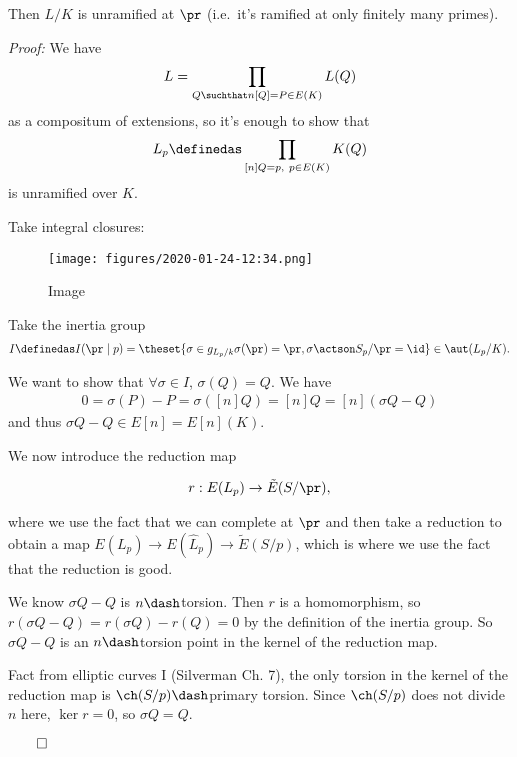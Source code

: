 Then \(L/K\) is unramified at \(\pr\) (i.e.~it's ramified at only
finitely many primes).

\emph{Proof:} We have
\begin{align*}
L = \prod_{Q \suchthat n[Q] = P \in E(K)} L(Q)
\end{align*} as a compositum of extensions, so it's enough to show that
\begin{align*}
L_p \definedas \prod_{[n] Q = p, ~p \in E(K)} K(Q)
\end{align*} is unramified over \(K\).

Take integral closures:

\begin{figure}
\centering
\texttt{[image: figures/2020-01-24-12:34.png]}
\caption{Image}
\end{figure}

Take the inertia group
\begin{align*}
I \definedas I(\pr \mid p) = \theset{\sigma \in g_{L_p/k} \sigma(\pr) = \pr, \sigma\actson S_p/\pr = \id} \in \aut(L_p/K)
.\end{align*}

We want to show that \(\forall \sigma \in I\), \(\sigma(Q) = Q\). We
have
\begin{align*}
0 = \sigma(P) - P = \sigma([n]Q) = [n]Q = [n](\sigma Q - Q)
\end{align*} and thus \(\sigma Q - Q \in E[n] = E[n](K)\).

We now introduce the reduction map

\begin{align*}
r: E(L_p) \to \tilde E(S/\pr)
,\end{align*}

where we use the fact that we can complete at \(\pr\) and then take a
reduction to obtain a map \(E(L_p) \to E(\hat L_p) \to \tilde E(S/p)\),
which is where we use the fact that the reduction is good.

We know \(\sigma Q - Q\) is \(n\dash\)torsion. Then \(r\) is a
homomorphism, so \(r(\sigma Q - Q) = r(\sigma Q) - r(Q) = 0\) by the
definition of the inertia group. So \(\sigma Q - Q\) is an
\(n\dash\)torsion point in the kernel of the reduction map.

Fact from elliptic curves I (Silverman Ch. 7), the only torsion in the
kernel of the reduction map is \(\ch (S/p)\dash\)primary torsion. Since
\(\ch(S/p)\) does not divide \(n\) here, \(\ker r = 0\), so
\(\sigma Q = Q\).

\(\qed\)

